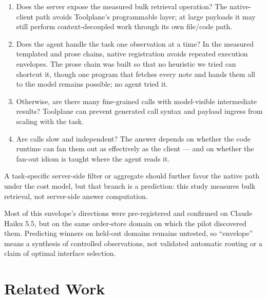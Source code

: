 \documentclass[10pt,twocolumn]{article}
\begin{document}
\begin{enumerate}
  \item Does the server expose the measured bulk retrieval operation?  The
  native-client path avoids Toolplane's programmable layer; at large payloads
  it may still perform context-decoupled work through its own file/code path.
  \item Does the agent handle the task one observation at a time?  In the
  measured templated and prose chains, native registration avoids repeated
  execution envelopes.  The prose chain was built so that no heuristic we
  tried can shortcut it, though one program that fetches every note and hands
  them all to the model remains possible; no agent tried it.
  \item Otherwise, are there many fine-grained calls with model-visible
  intermediate results?  Toolplane can prevent generated call syntax and
  payload ingress from scaling with the task.
  \item Are calls slow and independent?  The answer depends on whether the
  code runtime can fan them out as effectively as the client --- and on
  whether the fan-out idiom is taught where the agent reads it.
\end{enumerate}

A task-specific server-side filter or aggregate should further favor the
native path under the cost model, but that branch is a prediction: this study
measures bulk retrieval, not server-side answer computation.

Most of this envelope's directions were pre-registered and confirmed on Claude
Haiku 5.5, but on the same order-store domain on which the pilot discovered
them.  Predicting winners on held-out domains remains untested, so
``envelope'' means a synthesis of controlled observations, not validated
automatic routing or a claim of optimal interface selection.

\section{Related Work}
\label{sec:related}
\end{document}
